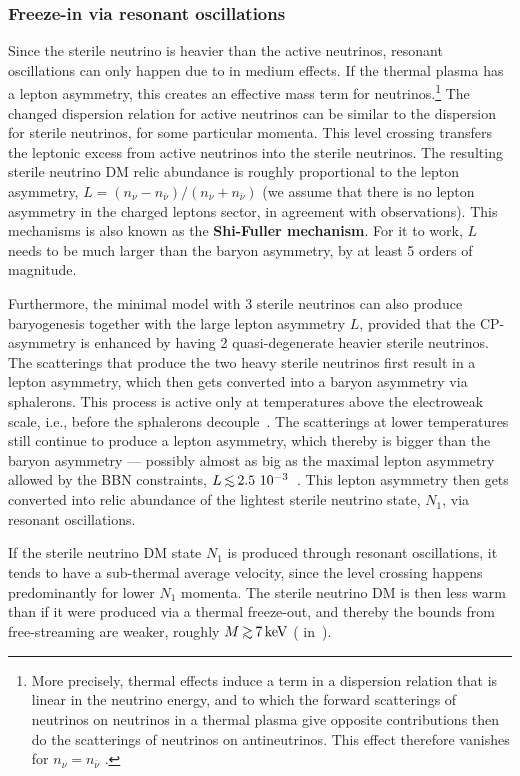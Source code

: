 \subsubsection{Freeze-in via resonant oscillations} 
Since the sterile neutrino is heavier than the active neutrinos, 
resonant oscillations can only happen due to in medium effects. 
If the thermal plasma has a lepton asymmetry, this creates an effective mass term for neutrinos.\footnote{More precisely, thermal effects induce a term in a dispersion relation that is linear in the neutrino energy, and to which the forward scatterings of neutrinos on neutrinos in a thermal plasma give opposite contributions then do the scatterings 
of neutrinos on antineutrinos. This effect therefore vanishes for $n_\nu =n_{\bar \nu}$ \cite{Noztold:Raffelt}.}
 The changed dispersion relation for active neutrinos can be similar to the dispersion for sterile neutrinos, for some particular momenta. This level crossing transfers the leptonic excess from active neutrinos into the sterile neutrinos. The resulting sterile neutrino DM relic abundance is roughly proportional to the lepton asymmetry, $L=(n_\nu-n_{\bar \nu})/(n_\nu+n_{\bar \nu})$ (we assume that there is no lepton asymmetry in the charged leptons sector, in agreement with observations). This mechanisms is also known as the {\bf Shi-Fuller mechanism}. For it to work, $L$ needs to be much larger than the baryon asymmetry, by at least 5 orders of magnitude. 

Furthermore, the minimal model with 3 sterile neutrinos can also produce baryogenesis together with the large lepton asymmetry $L$,
provided that the CP-asymmetry is enhanced by having 2 quasi-degenerate heavier sterile neutrinos.
The scatterings that produce the two heavy sterile neutrinos first result in a lepton asymmetry, which then
gets converted into a baryon asymmetry via sphalerons. This process is active only at temperatures above the electroweak scale, i.e., before the sphalerons decouple~\cite{SterileNu}.
The scatterings at lower temperatures still continue to produce a lepton asymmetry, which thereby is bigger than the baryon asymmetry  ---
possibly  almost as big as the maximal
lepton asymmetry allowed by the BBN constraints, $L \circa{<} 2.5~10^{-3}$~\cite{SterileNu}. This lepton asymmetry then gets converted into relic abundance of the lightest sterile neutrino state, $N_1$, via resonant oscillations.

If the  sterile neutrino DM state $N_1$ is produced through resonant oscillations, it tends to have a sub-thermal average velocity, since the  level crossing happens predominantly for lower $N_1$ momenta. The sterile neutrino DM is then less warm than if it were produced via a thermal freeze-out, 
and thereby the bounds from free-streaming are weaker, roughly $M \circa{>} 7\keV$ ( in~\cite{SterileNu}).


